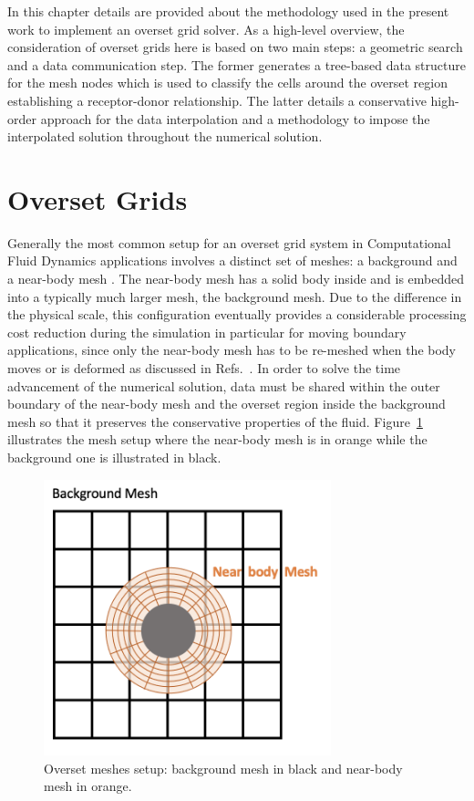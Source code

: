 In this chapter details are provided about the methodology used in the present work to implement an overset grid solver. As a high-level overview, the consideration of overset grids here is based on two main steps: a geometric search and a data communication step. The former generates a tree-based data structure for the mesh nodes which is used to classify the cells around the overset region establishing a receptor-donor relationship. The latter details a conservative high-order approach for the data interpolation and a methodology to impose the interpolated solution throughout the numerical solution.

\section{Overset Grids}

Generally the most common setup for an overset grid system in Computational Fluid Dynamics applications involves a distinct set of meshes: a background and a near-body mesh \cite{DuanThesis2019}. The near-body mesh has a solid body inside and is embedded into a typically much larger mesh, the background mesh. Due to the difference in the physical scale, this configuration eventually provides a considerable processing cost reduction during the simulation in particular for moving boundary applications, since only the near-body mesh has to be re-meshed when the body moves or is deformed as discussed in Refs.\ \cite{Duan2017, Duan2019, Crabill2016}. In order to solve the time advancement of the numerical solution, data must be shared within the outer boundary of the near-body mesh and the overset region inside the background mesh so that it preserves the conservative properties of the fluid. Figure\ \ref{fig:og_setup_fg} illustrates the mesh setup where the near-body mesh is in orange while the background one is illustrated in black.
%
\begin{figure}[H]
	\centering
    \includegraphics[height=8.0cm]{figs/overset/overset_setup.png}
    \caption{Overset meshes setup: background mesh in black and near-body mesh in orange.}
    \label{fig:og_setup_fg}
\end{figure}

